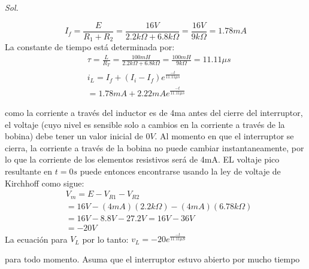 \textit{ Sol. }

\begin{equation*}
	I_{f}=\frac{E}{R_{1}+R_{2}}=\frac{16V}{2.2k\Omega+6.8k\Omega}= \frac{16V}{9k\Omega}=1.78mA
\end{equation*}
La constante de tiempo está determinada por:
\begin{align*}
	 & \tau=\frac{L}{R_{T}}=\frac{100mH}{2.2k\Omega+6.8k\Omega}=\frac{100mH}{9k\Omega}=11.11\mu s \\
	 & i_{L}=I_{f}+\left(I_{i}-I_{f}\right)e^{\frac{-t}{11.11\mu s}}                              \\
	 & =1.78mA+2.22mAe^{\frac{-t}{11.11\mu s}}
\end{align*}

como la corriente a través del inductor es de 4ma antes del cierre del interruptor, el voltaje (cuyo nivel es sensible solo a cambios en la corriente a través de la bobina) debe tener un valor inicial de $0V$. Al momento en que el interruptor se cierra, la corriente a través de la bobina no puede cambiar instantaneamente, por lo que la corriente de los elementos resistivos será de 4mA. EL voltaje pico resultante en $t=0s$ puede entonces encontrarse usando la ley de voltaje de Kirchhoff como sigue:
\begin{align*}
	 & V_{m}=E-V_{R1}-V_{R2}                                                                  \\
	 & =16V-\left(4mA\right)\left(2.2k\Omega\right)- \left(4mA\right)\left(6.78k\Omega\right) \\
	 & =16V-8.8V-27.2V=16V-36V                                                                \\
	 & =-20V
\end{align*}
La ecuación para $V_{L}$ por lo tanto: $v_{L}=-20e^{\frac{-t}{11.11 \mu S}}$


\begin{problem}[Encontrar $i_{0}, V_{0, i}$] para todo momento. Asuma que el interruptor estuvo abierto por mucho tiempo

\end{problem}

